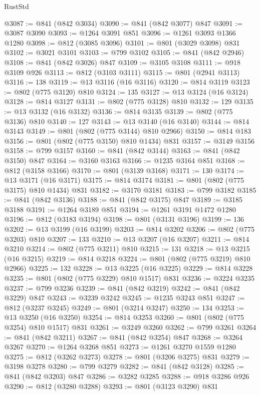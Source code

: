 \begin{lexlean}{RustStd}
\begin{coremodule}
@3087 := @841 (@842 @3034)
@3090 := @841 (@842 @3077) @847
@3091 := @3087 @3090
@3093 := @1264 @3091 @851
@3096 := @1261 @3093 @1366 @1280
@3098 := @812 (@3085 @3096)
@3101 := @801 (@3029 @3098) @831
@3102 := @3021 @3101
@3103 := @799 @3102
@3105 := @841 (@842 @2946)
@3108 := @841 (@842 @3026) @847
@3109 := @3105 @3108
@3111 := @918 @3109 @926
@3113 := @812 (@3103 @3111)
@3115 := @801 (@2941 @3113)
@3116 := 138
@3119 := @13 @3116 (@16 @3116)
@3120 := @814 @3119
@3123 := @802 (@775 @3120) @810
@3124 := 135
@3127 := @13 @3124 (@16 @3124)
@3128 := @814 @3127
@3131 := @802 (@775 @3128) @810
@3132 := 129
@3135 := @13 @3132 (@16 @3132)
@3136 := @814 @3135
@3139 := @802 (@775 @3136) @810
@3140 := 127
@3143 := @13 @3140 (@16 @3140)
@3144 := @814 @3143
@3149 := @801 (@802 (@775 @3144) @810 @2966)
@3150 := @814 @183
@3156 := @801 (@802 (@775 @3150) @810 @1434) @831
@3157 := @3149 @3156
@3158 := @799 @3157
@3160 := @841 (@842 @3144)
@3163 := @841 (@842 @3150) @847
@3164 := @3160 @3163
@3166 := @1235 @3164 @851
@3168 := @812 (@3158 @3166)
@3170 := @801 (@3139 @3168)
@3171 := 130
@3174 := @13 @3171 (@16 @3171)
@3175 := @814 @3174
@3181 := @801 (@802 (@775 @3175) @810 @1434) @831
@3182 := @3170 @3181
@3183 := @799 @3182
@3185 := @841 (@842 @3136)
@3188 := @841 (@842 @3175) @847
@3189 := @3185 @3188
@3191 := @1264 @3189 @851
@3194 := @1261 @3191 @1472 @1280
@3196 := @812 (@3183 @3194)
@3198 := @801 (@3131 @3196)
@3199 := 136
@3202 := @13 @3199 (@16 @3199)
@3203 := @814 @3202
@3206 := @802 (@775 @3203) @810
@3207 := 133
@3210 := @13 @3207 (@16 @3207)
@3211 := @814 @3210
@3214 := @802 (@775 @3211) @810
@3215 := 131
@3218 := @13 @3215 (@16 @3215)
@3219 := @814 @3218
@3224 := @801 (@802 (@775 @3219) @810 @2966)
@3225 := 132
@3228 := @13 @3225 (@16 @3225)
@3229 := @814 @3228
@3235 := @801 (@802 (@775 @3229) @810 @1517) @831
@3236 := @3224 @3235
@3237 := @799 @3236
@3239 := @841 (@842 @3219)
@3242 := @841 (@842 @3229) @847
@3243 := @3239 @3242
@3245 := @1235 @3243 @851
@3247 := @812 (@3237 @3245)
@3249 := @801 (@3214 @3247)
@3250 := 134
@3253 := @13 @3250 (@16 @3250)
@3254 := @814 @3253
@3260 := @801 (@802 (@775 @3254) @810 @1517) @831
@3261 := @3249 @3260
@3262 := @799 @3261
@3264 := @841 (@842 @3211)
@3267 := @841 (@842 @3254) @847
@3268 := @3264 @3267
@3270 := @1264 @3268 @851
@3273 := @1261 @3270 @1559 @1280
@3275 := @812 (@3262 @3273)
@3278 := @801 (@3206 @3275) @831
@3279 := @3198 @3278
@3280 := @799 @3279
@3282 := @841 (@842 @3128)
@3285 := @841 (@842 @3203) @847
@3286 := @3282 @3285
@3288 := @918 @3286 @926
@3290 := @812 (@3280 @3288)
@3293 := @801 (@3123 @3290) @831

\end{coremodule}
\end{lexlean}
